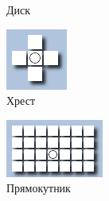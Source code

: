 \begin{figure}[H]
\begin{subfigure}[b]{0.2\textwidth}
		\caption{Диск}
		\label{fig:kernel_disk}
	\end{subfigure}
	\hfill
	\begin{subfigure}[b]{0.2\textwidth}
		\includegraphics[width=\textwidth]{theory/img/kernel_diamond}
		\caption{Хрест}
		\label{fig:kernel_diamond}
	\end{subfigure}
	\hfill
	\begin{subfigure}[b]{0.2\textwidth}
		\includegraphics[width=\textwidth]{theory/img/kernel_rectangle}
		\caption{Прямокутник}
		\label{fig:kernel_rectangle}
	\end{subfigure}
	\hfill
	\begin{subfigure}[b]{0.2\textwidth}

\end{subfigure}
\end{figure}
